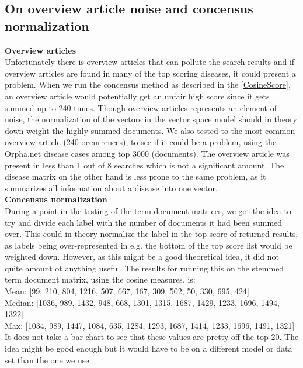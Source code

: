 \subsection{On overview article noise and concensus normalization\label{Overview}}

\textbf{Overview articles}\\
Unfortunately there is overview articles that can pollute the search results and if overview articles are found in many of the top scoring diseases, it could present a problem. When we run the concensus method as described in the \ref{CosineScore}, an overview article would potentially get an unfair high score since it gets summed up to 240 times. Though overview articles represents an element of noise, the normalization of the vectors in the vector space model should in theory down weight the highly summed documents. We also tested to the most common overview article (240 occurrences), to see if it could be a problem, using the Orpha.net disease cases among top 3000 (documents). The overview article was present in less than 1 out of 8 searches which is not a significant amount. The disease matrix on the other hand is less prone to the same problem, as it summarizes all information about a disease into one vector. \\

\textbf{Concensus normalization} \\
During a point in the testing of the term document matrices, we got the idea to try and divide each label with the number of documents it had been summed over. This could in theory normalize the label in the top score of returned results, as labels being over-represented in e.g. the bottom of the top score list would be weighted down. However, as this might be a good theoretical idea, it did not quite amount ot anything useful. The results for running this on the stemmed term document matrix, using the cosine measures, is: \\
{\small
Mean: [99, 210, 804, 1216, 507, 667, 167, 309, 502, 50, 330, 695, 424] \\
Median: [1036, 989, 1432, 948, 668, 1301, 1315, 1687, 1429, 1233, 1696, 1494, 1322] \\
Max: [1034, 989, 1447, 1084, 635, 1284, 1293, 1687, 1414, 1233, 1696, 1491, 1321] \\
}
It does not take a bar chart to see that these values are pretty off the top 20. The idea might be good enough but it would have to be on a different model or data set than the one we use.
